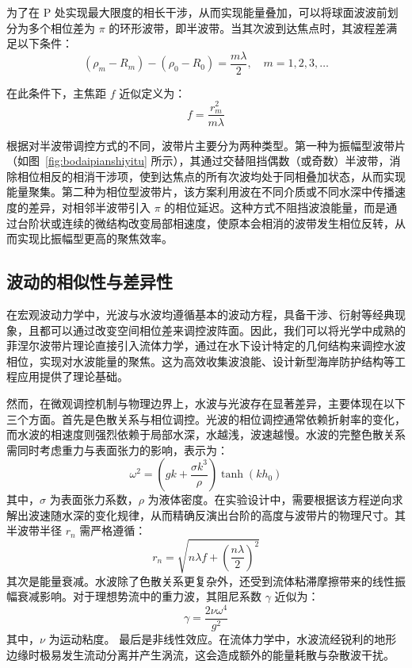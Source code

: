 \documentclass[11pt,a4paper]{ctexart}
\begin{document}
为了在 P 处实现最大限度的相长干涉，从而实现能量叠加，可以将球面波波前划分为多个相位差为 $\pi$ 的环形波带，即半波带。当其次波到达焦点时，其波程差满足以下条件：
\begin{equation}
(\rho_m - R_m) - (\rho_0 - R_0) = \frac{m\lambda}{2}, \quad m=1, 2, 3, \dots
\end{equation}

在此条件下，主焦距 $f$ 近似定义为：
\begin{equation}
f = \frac{r_m^2}{m\lambda}
\end{equation}

根据对半波带调控方式的不同，波带片主要分为两种类型。第一种为振幅型波带片（如图~\ref{fig:bodaipianshiyitu} 所示），其通过交替阻挡偶数（或奇数）半波带，消除相位相反的相消干涉项，使到达焦点的所有次波均处于同相叠加状态，从而实现能量聚集。第二种为相位型波带片，该方案利用波在不同介质或不同水深中传播速度的差异，对相邻半波带引入 $\pi$ 的相位延迟。这种方式不阻挡波浪能量，而是通过台阶状或连续的微结构改变局部相速度，使原本会相消的波带发生相位反转，从而实现比振幅型更高的聚焦效率\cite{hecht2017optics}。

\subsection{波动的相似性与差异性}

在宏观波动力学中，光波与水波均遵循基本的波动方程，具备干涉、衍射等经典现象，且都可以通过改变空间相位差来调控波阵面。因此，我们可以将光学中成熟的菲涅尔波带片理论直接引入流体力学，通过在水下设计特定的几何结构来调控水波相位，实现对水波能量的聚焦。这为高效收集波浪能、设计新型海岸防护结构等工程应用提供了理论基础\cite{li2018concentrators}。

然而，在微观调控机制与物理边界上，水波与光波存在显著差异，主要体现在以下三个方面。首先是色散关系与相位调控。光波的相位调控通常依赖折射率的变化，而水波的相速度则强烈依赖于局部水深，水越浅，波速越慢。水波的完整色散关系需同时考虑重力与表面张力的影响，表示为：
\begin{equation}
\omega^2 = \left(gk + \frac{\sigma k^3}{\rho}\right)\tanh(kh_0)
\label{dispersion}
\end{equation}
其中，$\sigma$ 为表面张力系数，$\rho$ 为液体密度。在实验设计中，需要根据该方程逆向求解出波速随水深的变化规律，从而精确反演出台阶的高度与波带片的物理尺寸。其半波带半径 $r_n$ 需严格遵循：
\begin{equation}
r_n = \sqrt{n\lambda f + \left(\frac{n\lambda}{2}\right)^2}
\end{equation}
其次是能量衰减。水波除了色散关系更复杂外，还受到流体粘滞摩擦带来的线性振幅衰减影响。对于理想势流中的重力波，其阻尼系数 $\gamma$ 近似为：
\begin{equation}
\gamma = \frac{2\nu\omega^4}{g^2}
\end{equation}
其中，$\nu$ 为运动粘度。
最后是非线性效应。在流体力学中，水波流经锐利的地形边缘时极易发生流动分离并产生涡流，这会造成额外的能量耗散与杂散波干扰。
\end{document}

